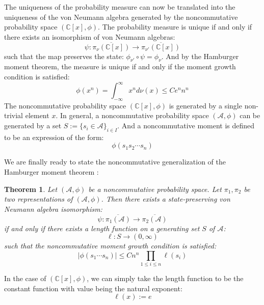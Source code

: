 \documentclass[a4paper,11pt]{article}
\newtheorem{theorem}{Theorem}
\theoremstyle{definition}
\numberwithin{equation}{section}
\begin{document}
The uniqueness of the probability measure can now be translated into the uniqueness of the von Neumann algebra generated by the noncommutative probability space $(\mathbb{C}[x],\phi)$. The probability measure is unique if and only if there exists an isomorphism of von Neumann algebras:
\begin{equation}
    \psi:\overline{\pi_\nu(\mathbb{C}[x])}\rightarrow\overline{\pi_{\nu'}(\mathbb{C}[x])}
\end{equation}
such that the map preserves the state: $\phi_{\nu'}\circ\psi = \phi_\nu$. And by the Hamburger moment theorem, the measure is unique if and only if the moment growth condition is satisfied:
\begin{equation}
    \phi(x^n) = \int_{-\infty}^\infty x^nd\nu(x) \leq Ce^nn^n
\end{equation}
The noncommutative probability space $(\mathbb{C}[x],\phi)$ is generated by a single non-trivial element $x$. In general, a noncommutative probability space $(\mathcal{A},\phi)$ can be generated by a set $S:=\{s_i\in\mathcal{A}\}_{i\in I}$. And a noncommutative moment is defined to be an expression of the form:
\begin{equation}
    \phi(s_1s_2\cdots s_n)
\end{equation}

We are finally ready to state the noncommutative generalization of the Hamburger moment theorem \cite{MAW}:
\begin{theorem}
    Let $(\mathcal{A},\phi)$ be a noncommutative probability space. Let $\pi_1,\pi_2$ be two representations of $(\mathcal{A},\phi)$. Then there exists a state-preserving von Neumann algebra isomorphism:
    \begin{equation}
        \psi:\overline{\pi_1(\mathcal{A})}\rightarrow\overline{\pi_2(\mathcal{A})}
    \end{equation}
    if and only if there exists a length function on a generating set $S$ of $\mathcal{A}$:
    \begin{equation}
        \ell:S\rightarrow(0,\infty)
    \end{equation}
    such that the noncommutative \textit{moment growth} condition is satisfied:
    \begin{equation*}
        |\phi(s_1\cdots s_n)| \leq Cn^n\prod_{1\leq i\leq n}\ell(s_i)
    \end{equation*}
\end{theorem}
In the case of $(\mathbb{C}[x],\phi)$, we can simply take the length function to be the constant function with value being the natural exponent:
\begin{equation}
    \ell(x) := e
\end{equation}
\end{document}
